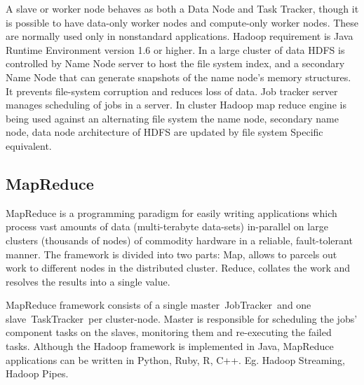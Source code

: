 A slave or worker node behaves as both a Data Node and Task Tracker, though it is possible to have data-only worker nodes and compute-only worker nodes. These are normally used only in nonstandard applications. Hadoop requirement is Java Runtime Environment  version 1.6 or higher. In a large cluster of data HDFS is controlled by Name Node server to host the file system index, and a secondary Name Node that can generate snapshots of the name node's memory structures. It  prevents file-system corruption and reduces loss of data. Job tracker server manages scheduling of jobs in a server. In cluster Hadoop map reduce engine is being used against an alternating file system the name node, secondary name node, data node architecture of HDFS are updated by file system Specific equivalent.

\subsection{MapReduce}
MapReduce is a programming paradigm for easily writing applications which process vast amounts of data (multi-terabyte data-sets) in-parallel on large clusters (thousands of nodes) of commodity hardware in a reliable, fault-tolerant manner. The framework is divided into two parts: Map, allows to parcels out work to different nodes in the distributed cluster. Reduce, collates the work and resolves the results into a single value.

MapReduce framework consists of a single master JobTracker and one slave TaskTracker per cluster-node. Master is responsible for scheduling the jobs' component tasks on the slaves, monitoring them and re-executing the failed tasks. Although the Hadoop framework is implemented in Java, MapReduce applications can be written in Python, Ruby, R, C++. Eg. Hadoop Streaming, Hadoop Pipes.

